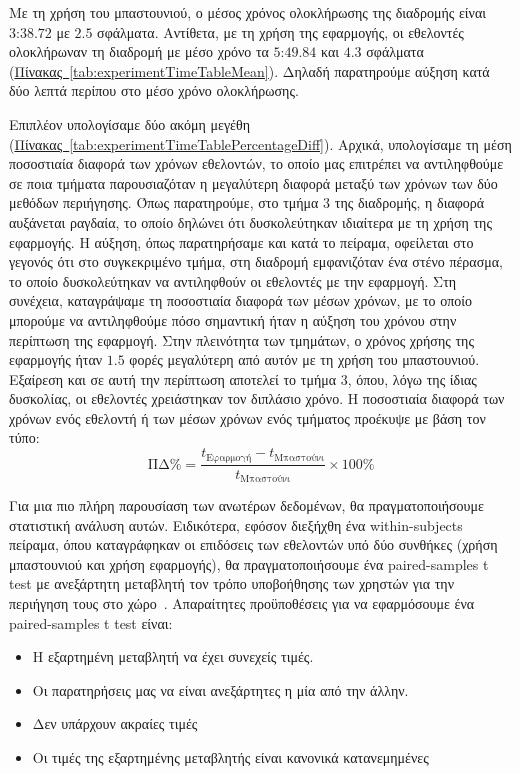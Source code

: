 

Με τη χρήση του μπαστουνιού, ο μέσος χρόνος ολοκλήρωσης της διαδρομής είναι $\text{3:38.72}$ με $\text{2.5}$ σφάλματα. Αντίθετα, με τη χρήση της εφαρμογής, οι εθελοντές ολοκλήρωναν τη διαδρομή με μέσο χρόνο τα $\text{5:49.84}$ και $\text{4.3}$ σφάλματα (\hyperref[tab:experimentTimeTableMean]{Πίνακας~\ref*{tab:experimentTimeTableMean}}). Δηλαδή παρατηρούμε αύξηση κατά δύο λεπτά περίπου στο μέσο χρόνο ολοκλήρωσης.

Επιπλέον υπολογίσαμε δύο ακόμη μεγέθη (\hyperref[tab:experimentTimeTablePercentageDiff]{Πίνακας~\ref*{tab:experimentTimeTablePercentageDiff}}). Αρχικά, υπολογίσαμε τη μέση ποσοστιαία διαφορά των χρόνων εθελοντών, το οποίο μας επιτρέπει να αντιληφθούμε σε ποια τμήματα παρουσιαζόταν η μεγαλύτερη διαφορά μεταξύ των χρόνων των δύο μεθόδων περιήγησης. Όπως παρατηρούμε, στο τμήμα 3 της διαδρομής, η διαφορά αυξάνεται ραγδαία, το οποίο δηλώνει ότι δυσκολεύτηκαν ιδιαίτερα με τη χρήση της εφαρμογής. Η αύξηση, όπως παρατηρήσαμε και κατά το πείραμα, οφείλεται στο γεγονός ότι στο συγκεκριμένο τμήμα, στη διαδρομή εμφανιζόταν ένα στένο πέρασμα, το οποίο δυσκολεύτηκαν να αντιληφθούν οι εθελοντές με την εφαρμογή. Στη συνέχεια, καταγράψαμε τη ποσοστιαία διαφορά των μέσων χρόνων, με το οποίο μπορούμε να αντιληφθούμε πόσο σημαντική ήταν η αύξηση του χρόνου στην περίπτωση της εφαρμογή. Στην πλεινότητα των τμημάτων, ο χρόνος χρήσης της εφαρμογής ήταν $1.5$ φορές μεγαλύτερη από αυτόν με τη χρήση του μπαστουνιού. Εξαίρεση και σε αυτή την περίπτωση αποτελεί το τμήμα 3, όπου, λόγω της ίδιας δυσκολίας, οι εθελοντές χρειάστηκαν τον διπλάσιο χρόνο. Η ποσοστιαία διαφορά των χρόνων ενός εθελοντή ή των μέσων χρόνων ενός τμήματος προέκυψε με βάση τον τύπο:
\[
    \text{ΠΔ\%} = \frac{t_{\text{Εφαρμογή}} - t_{\text{Μπαστούνι}}}{t_{\text{Μπαστούνι}}} \times 100\%
\]

Για μια πιο πλήρη παρουσίαση των ανωτέρων δεδομένων, θα πραγματοποιήσουμε στατιστική ανάλυση αυτών. Ειδικότερα, εφόσον διεξήχθη ένα within-subjects πείραμα, όπου καταγράφηκαν οι επιδόσεις των εθελοντών υπό δύο συνθήκες (χρήση μπαστουνιού και χρήση εφαρμογής), θα πραγματοποιήσουμε ένα paired-samples t test με ανεξάρτητη μεταβλητή τον τρόπο υποβοήθησης των χρηστών για την περιήγηση τους στο χώρο~\cite{lazar_2017_research}. Απαραίτητες προϋποθέσεις για να εφαρμόσουμε ένα paired-samples t test είναι:
\begin{itemize}
    \item Η εξαρτημένη μεταβλητή να έχει συνεχείς τιμές.
    \item Οι παρατηρήσεις μας να είναι ανεξάρτητες η μία από την άλλην.
    \item Δεν υπάρχουν ακραίες τιμές
    \item Οι τιμές της εξαρτημένης μεταβλητής είναι κανονικά κατανεμημένες
\end{itemize}


